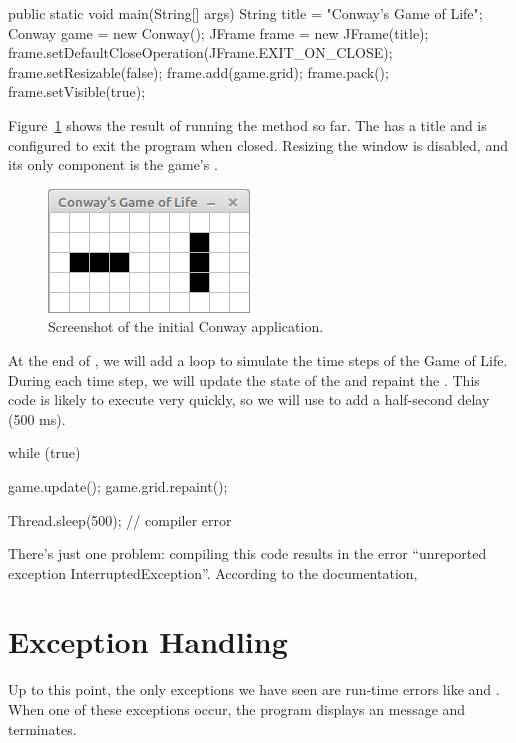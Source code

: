 \begin{code}
public static void main(String[] args) {
    String title = "Conway's Game of Life";
    Conway game = new Conway();
    JFrame frame = new JFrame(title);
    frame.setDefaultCloseOperation(JFrame.EXIT_ON_CLOSE);
    frame.setResizable(false);
    frame.add(game.grid);
    frame.pack();
    frame.setVisible(true);
}
\end{code}

Figure~\ref{fig:conway} shows the result of running the  method so far.
The  has a title and is configured to exit the program when closed.
Resizing the window is disabled, and its only component is the game's .

\begin{figure}[!ht]
\begin{center}
\includegraphics{figs/conway.png}
\caption{Screenshot of the initial Conway application.}
\label{fig:conway}
\end{center}
\end{figure}

At the end of , we will add a  loop to simulate the time steps of the Game of Life.
During each time step, we will update the state of the  and repaint the .
This code is likely to execute very quickly, so we will use  to add a half-second delay (500 ms).

\begin{code}
while (true) {
    game.update();
    game.grid.repaint();
    
    Thread.sleep(500);  // compiler error
}
\end{code}

There's just one problem: compiling this code results in the error ``unreported exception InterruptedException''.
According to the documentation, 


\section{Exception Handling}

Up to this point, the only exceptions we have seen are run-time errors like  and .
When one of these exceptions occur, the program displays an message and terminates.

